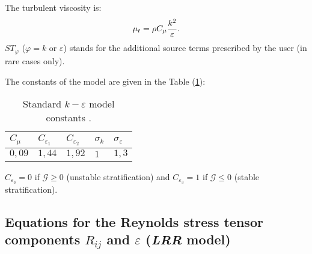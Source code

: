 The turbulent viscosity is: 
\begin{equation}
\displaystyle \mu_t=\rho C_\mu\frac{k^2}{%
\varepsilon}.
\end{equation}
$ST_{\varphi }$ ($\varphi =k$ or $\varepsilon $) stands for the additional
source terms prescribed by the user (in rare cases only).

The constants of the model are given in the Table (\ref{tab:k_epsilon_constants}):
\begin{table}[htp]
\centering
\begin{tabular}{p{}|p{}|p{}|p{}|p{}}
$C_\mu$ & $C_{\varepsilon_1}$ & $C_{\varepsilon_2}$ & $\sigma_k$ & $%
\sigma_\varepsilon$ \\ \hline
$0,09$ & $1,44$ & $1,92$ & $1$ & $1,3$ 
\end{tabular}%
\caption{Standard $k-\varepsilon$ model constants \cite{Launder:1972}.\label{tab:k_epsilon_constants}}
\end{table}

$C_{\varepsilon_3}=0$ if $\mathcal{G}\geqslant0$ (unstable stratification)
and $C_{\varepsilon_3}=1$ if $\mathcal{G}\leqslant0$ (stable stratification).


\subsection{Equations for the Reynolds stress tensor components $R_{ij}$ 
and $\varepsilon$ (\emph{LRR} model)}
%

